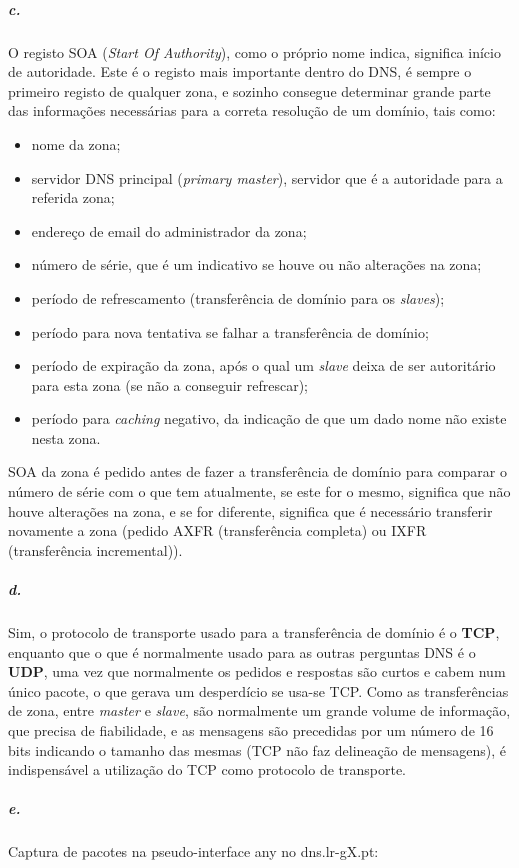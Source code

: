 \subparagraph{c.}
O registo SOA (\emph{Start Of Authority}), como o próprio nome indica, significa início de autoridade. Este é o registo mais importante dentro do DNS, é sempre o primeiro registo de qualquer zona, e sozinho consegue determinar grande parte das informações necessárias para a correta resolução de um domínio, tais como:
\begin{itemize}
\item nome da zona;
\item servidor DNS principal (\emph{primary master}), servidor que é a autoridade para a referida zona;
\item endereço de email do administrador da zona;
\item número de série, que é um indicativo se houve ou não alterações na zona;
\item período de refrescamento (transferência de domínio para os \emph{slaves});
\item período para nova tentativa se falhar a transferência de domínio;
\item período de expiração da zona, após o qual um \emph{slave} deixa de ser autoritário para esta zona (se não a conseguir refrescar);
\item período para \emph{caching} negativo, da indicação de que um dado nome não existe nesta zona.
\end{itemize}

SOA da zona é pedido antes de fazer a transferência de domínio para comparar o número de série com o que tem atualmente, se este for o mesmo, significa que não houve alterações na zona, e se for diferente, significa que é necessário transferir novamente a zona (pedido AXFR (transferência completa) ou IXFR (transferência incremental)).


\subparagraph{d.}
Sim, o protocolo de transporte usado para a transferência de domínio é o \textbf{TCP}, enquanto que o que é normalmente usado para as outras perguntas DNS é o \textbf{UDP}, uma vez que normalmente os pedidos e respostas são curtos e cabem num único pacote, o que gerava um desperdício se usa-se TCP.
Como as transferências de zona, entre \emph{master} e \emph{slave}, são normalmente um grande volume de informação, que precisa de fiabilidade, e as mensagens são precedidas por um número de 16 bits indicando o tamanho das mesmas (TCP não faz delineação de mensagens), é indispensável a utilização do TCP como protocolo de transporte.


\subparagraph{e.}
Captura de pacotes na pseudo-interface \textsf{any} no dns.lr-gX.pt:

